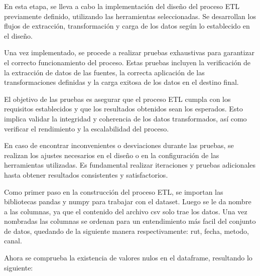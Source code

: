 En esta etapa, se lleva a cabo la implementación del diseño del proceso ETL previamente definido, utilizando las herramientas seleccionadas. Se desarrollan los flujos de extracción, transformación y carga de los datos según lo establecido en el diseño.

Una vez implementado, se procede a realizar pruebas exhaustivas para garantizar el correcto funcionamiento del proceso. Estas pruebas incluyen la verificación de la extracción de datos de las fuentes, la correcta aplicación de las transformaciones definidas y la carga exitosa de los datos en el destino final.

El objetivo de las pruebas es asegurar que el proceso ETL cumpla con los requisitos establecidos y que los resultados obtenidos sean los esperados. Esto implica validar la integridad y coherencia de los datos transformados, así como verificar el rendimiento y la escalabilidad del proceso.

En caso de encontrar inconvenientes o desviaciones durante las pruebas, se realizan los ajustes necesarios en el diseño o en la configuración de las herramientas utilizadas. Es fundamental realizar iteraciones y pruebas adicionales hasta obtener resultados consistentes y satisfactorios.

Como primer paso en la construcción del proceso ETL, se importan las bibliotecas pandas y numpy para trabajar con el dataset. Luego se le da nombre a las columnas, ya que el contenido del archivo csv solo trae los datos. Una vez nombradas las columnas se ordenan para un entendimiento más facil del conjunto de datos, quedando de la siguiente manera respectivamente: rut, fecha, metodo, canal.

Ahora se comprueba la existencia de valores nulos en el dataframe, resultando lo siguiente:

